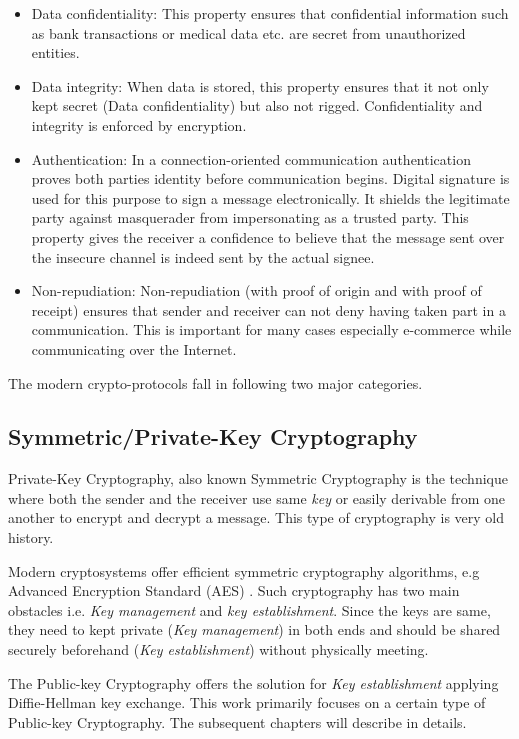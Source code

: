 \begin{itemize}
\item Data confidentiality:
This property ensures that confidential information such as bank transactions or medical data etc. are secret from unauthorized entities. 

\item Data integrity:
When data is stored, this property ensures that it not only kept secret (Data confidentiality) but also not rigged.
Confidentiality and integrity is enforced by encryption.

\item Authentication:
In a connection-oriented communication authentication proves both parties identity before communication begins.
Digital signature is used for this purpose to sign a message electronically.
It shields the legitimate party against masquerader from impersonating as a trusted party.
This property gives the receiver a confidence to believe that the message sent over the insecure channel is indeed sent by the actual signee.

\item Non-repudiation:
Non-repudiation (with proof of origin and with proof of receipt) ensures that sender and receiver can not deny having taken part in a communication.
This is important for many cases especially e-commerce while communicating over the Internet.
\end{itemize}

The modern crypto-protocols fall in following two major categories. 

\subsection{Symmetric/Private-Key Cryptography}
Private-Key Cryptography, also known Symmetric Cryptography is the technique where both the sender and the receiver use same \textit{key} or easily derivable from one another to encrypt and decrypt a message.
This type of cryptography is very old history. 

Modern cryptosystems offer efficient symmetric cryptography algorithms, e.g Advanced Encryption Standard (AES) \cite{AES_DaemenR02}.
Such cryptography has two main obstacles i.e. \textit{Key management} and \textit{key establishment}.
Since the keys are same, they need to kept private (\textit{Key management})  in both ends and should be shared securely beforehand (\textit{Key establishment}) without physically meeting.

The Public-key Cryptography offers the solution for \textit{Key establishment} applying Diffie-Hellman key exchange.
This work primarily focuses on a certain type of Public-key Cryptography. 
The subsequent chapters will describe in details.

